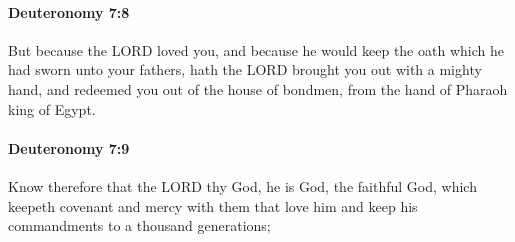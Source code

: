 		\paragraph{Deuteronomy 7:8} %
			\label{DEUTERONOMY-7-8}

			But because the LORD loved you, and because he would keep the oath which he had sworn unto your fathers, hath the LORD brought you out with a mighty hand, and redeemed you out of the house of bondmen, from the hand of Pharaoh king of Egypt.


		\paragraph{Deuteronomy 7:9} %
			\label{DEUTERONOMY-7-9}

			Know therefore that the LORD thy God, he is God, the faithful God, which keepeth covenant and mercy with them that love him and keep his commandments to a thousand generations;

